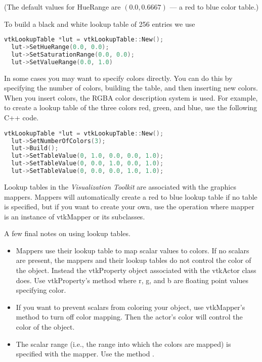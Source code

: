 (The default values for HueRange are $(0.0, 0.6667)$ --- a red to blue color table.)

To build a black and white lookup table of 256 entries we use

\begin{lstlisting}[language=C++, caption={Create a black and white lookup table.}]
vtkLookupTable *lut = vtkLookupTable::New();
  lut->SetHueRange(0.0, 0.0);
  lut->SetSaturationRange(0.0, 0.0);
  lut->SetValueRange(0.0, 1.0)
\end{lstlisting}

In some cases you may want to specify colors directly. You can do this by specifying the number of colors, building the table, and then inserting new colors. When you insert colors, the RGBA color description system is used. For example, to create a lookup table of the three colors red, green, and blue, use the following C++ code.

\begin{lstlisting}[language=C++, caption={Directly specifying colors.}]
vtkLookupTable *lut = vtkLookupTable::New();
  lut->SetNumberOfColors(3);
  lut->Build();
  lut->SetTableValue(0, 1.0, 0.0, 0.0, 1.0);
  lut->SetTableValue(0, 0.0, 1.0, 0.0, 1.0);
  lut->SetTableValue(0, 0.0, 0.0, 1.0, 1.0);
\end{lstlisting}

Lookup tables in the \emph{Visualization Toolkit} are associated with the graphics mappers. Mappers will automatically create a red to blue lookup table if no table is specified, but if you want to create your own, use the  operation where mapper is an instance of vtkMapper or its subclasses.

A few final notes on using lookup tables.

\begin{itemize}

\item  Mappers use their lookup table to map scalar values to colors. If no scalars are present, the mappers and their lookup tables do not control the color of the object. Instead the vtkProperty object associated with the vtkActor class does. Use vtkProperty's method  where r, g, and b are floating point values specifying color.

\item If you want to prevent scalars from coloring your object, use vtkMapper's method  to turn off color mapping. Then the actor's color will control the color of the object.

\item The scalar range (i.e., the range into which the colors are mapped) is specified with the mapper. Use the method .

\end{itemize}

